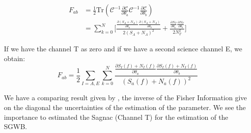 \documentclass[a4paper,12pt]{article}
\begin{document}
\begin{equation} 
\begin{split}
     F_{ab} & =   \frac{1}{2} \mathrm{Tr}\left(\mathcal{C}^{-1}\frac{\partial \mathcal{C}} {\partial \theta_a} \mathcal{C}^{-1} \frac{\partial \mathcal{C}}{\partial\theta_b}  \right)  \\ 
     &=  \sum_{k=0}^{N} \Bigg[\frac{\frac{\partial (S_A+N_A)} {\partial \theta_a}\frac{\partial (S_A+N_A)} {\partial \theta_b}}{2(S_A+N_A)^2} + \frac{\frac{\partial N_T} {\partial \theta_a}\frac{\partial N_T} {\partial \theta_b}}{2N_T^2}\Bigg]
\end{split}
\end{equation}

If we have the channel T as zero and if we have a second science channel E, we obtain:
\begin{equation}
    F_{ab} =  \frac{1}{2} \sum_{I=A,E} \sum_{k=0}^N \frac{\frac{\partial S_I(f)+ N_I(f)} {\partial \theta_a}\frac{\partial S_I(f)+ N_I(f)} {\partial \theta_b}}{\left(S_a(f)+ N_a(f)\right)^2} 
\end{equation}

We have a comparing result given by \cite{PhysRevD.100.104055}, the inverse of the Fisher Information give on the diagonal the uncertainties of the estimation of the parameter. We see the importance to estimated the Sagnac (Channel T) for the estimation of the SGWB.  
\end{document}
